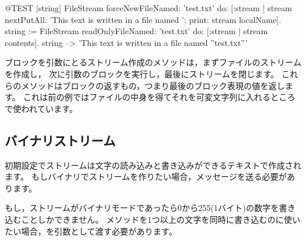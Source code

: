 \documentclass[a4paper,10pt,twoside]{book}
\begin{document}
{\begin{code}{@TEST |string|}
FileStream
    forceNewFileNamed: 'test.txt'
    do: [:stream |
        stream
            nextPutAll: 'This text is written in a file named ';
            print: stream localName].
string := FileStream
            readOnlyFileNamed: 'test.txt'
            do: [:stream | stream contents].
string --> 'This text is written in a file named ''test.txt'''
\end{code}

ブロックを引数にとるストリーム作成のメソッドは，まずファイルのストリームを作成し，
次に引数のブロックを実行し，最後にストリームを閉じます。
これらのメソッドはブロックの返すもの，つまり最後のブロック表現の値を返します。
これは前の例ではファイルの中身を得てそれを可変文字列に入れるところで使われています。

\subsection{バイナリストリーム}


初期設定でストリームは文字の読み込みと書き込みができるテキストで作成されます。
もしバイナリでストリームを作りたい場合，メッセージを送る必要があります。


もし，ストリームがバイナリモードであったら0から255(1バイト)の数字を書き込むことしかできません。
メソッドを1つ以上の文字を同時に書き込むのに使いたい場合，を引数として渡す必要があります。

}
\end{document}
